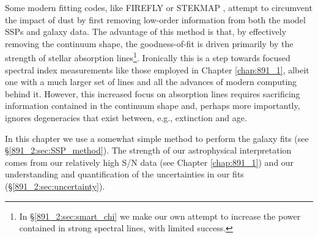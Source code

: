 Some modern fitting codes, like FIREFLY \citep{Wilkinson15} or STEKMAP
\citep{Ocvirk06}, attempt to circumvent the impact of dust by first
removing low-order information from both the model SSPs and galaxy
data. The advantage of this method is that, by effectively removing
the continuum shape, the goodness-of-fit is driven primarily by the
strength of stellar absorption lines\footnote{ In
  \S\ref{891_2:sec:smart_chi} we make our own attempt to increase the
  power contained in strong spectral lines, with limited
  success.}. Ironically this is a step towards focused spectral index
measurements like those employed in Chapter \ref{chap:891_1}, albeit
one with a much larger set of lines and all the advances of modern
computing behind it. However, this increased focus on absorption lines
requires sacrificing information contained in the continuum shape and,
perhaps more importantly, ignores degeneracies that exist between,
e.g., extinction and age.

In this chapter we use a somewhat simple method to perform the galaxy
fits (see \S\ref{891_2:sec:SSP_method}). The strength of our
astrophysical interpretation comes from our relatively high S/N data
(see Chapter \ref{chap:891_1}) and our understanding and
quantification of the uncertainties in our fits
(\S\ref{891_2:sec:uncertainty}).




